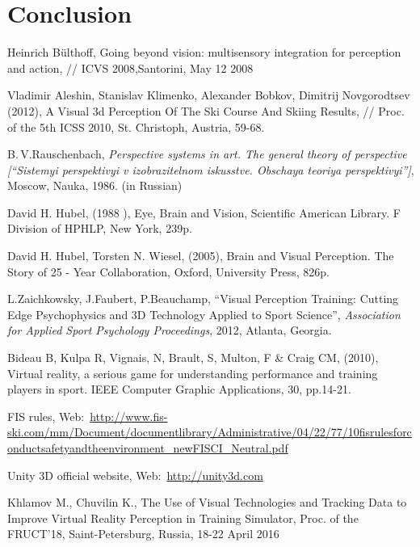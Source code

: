 \documentclass[twoside]{article}
\begin{document}
\section{Conclusion}\label{conclusion}

\vspace*{-2mm}
\begin{thebibliography}{99}
\itemsep=-2pt

	Heinrich Bülthoff, Going beyond vision: multisensory integration for perception and action, // ICVS 2008,Santorini, May 12 2008

	Vladimir Aleshin, Stanislav Klimenko, Alexander Bobkov, Dimitrij Novgorodtsev (2012), A Visual 3d Perception Of The Ski Course And Skiing Results, // Proc. of the 5th ICSS 2010, St. Christoph, Austria, 59-68.

	B.\,V.\;Rauschenbach,
	\emph{Perspective systems in art. The general theory of perspective
	[``Sistemyi perspektivyi v izobrazitelnom iskusstve. Obschaya teoriya perspektivyi'']},
	Moscow, Nauka, 1986. (in Russian)

	David H. Hubel, (1988 ), Eye, Brain and Vision, Scientific American Library. F Division of HPHLP, New York, 239p.

	David H. Hubel, Torsten N. Wiesel, (2005), Brain and Visual  Perception. The Story of 25 - Year Collaboration, Oxford, University Press, 826p.

	L.\;Zaichkowsky, J.\;Faubert, P.\;Beauchamp,
	``Visual Perception Training: Cutting Edge Psychophysics and 3D Technology Applied to Sport Science'',
	\emph{Association for Applied Sport Psychology Proceedings},
	2012, Atlanta, Georgia.

	Bideau B, Kulpa R, Vignais, N, Brault, S, Multon, F \& Craig CM, (2010), Virtual reality, a serious game for understanding performance and training players in sport. IEEE Computer 		Graphic Applications, 30, pp.14-21.

	FIS rules,
	Web:~\url{http://www.fis-ski.com/mm/Document/documentlibrary/Administrative/04/22/77/10fisrulesforconductsafetyandtheenvironment_newFISCI_Neutral.pdf}

	Unity 3D official website,
	Web:~\url{http://unity3d.com}

	Khlamov M., Chuvilin K., The Use of Visual Technologies and Tracking Data to Improve Virtual Reality Perception in Training Simulator, Proc. of the FRUCT'18, Saint-Petersburg, Russia, 	18-22 April 2016

\end{thebibliography}
\end{document}
